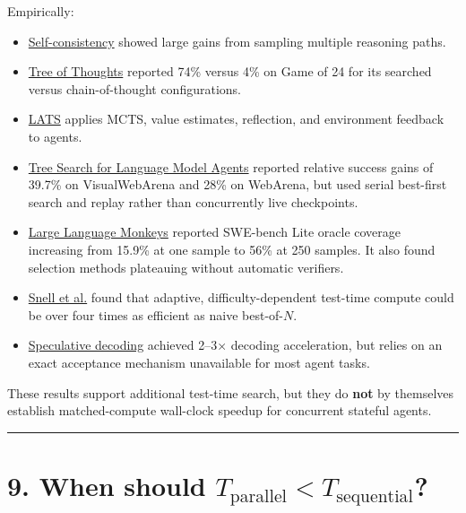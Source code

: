 \documentclass[
  letterpaper,
]{article}
\providecommand{\tightlist}{%
  \setlength{\itemsep}{0pt}\setlength{\parskip}{0pt}}
\begin{document}
Empirically:

\begin{itemize}
\tightlist
\item
  \href{https://arxiv.org/abs/2203.11171}{Self-consistency} showed large gains from sampling multiple reasoning paths.
\item
  \href{https://arxiv.org/abs/2305.10601}{Tree of Thoughts} reported 74\% versus 4\% on Game of 24 for its searched versus chain-of-thought configurations.
\item
  \href{https://arxiv.org/abs/2310.04406}{LATS} applies MCTS, value estimates, reflection, and environment feedback to agents.
\item
  \href{https://arxiv.org/abs/2407.01476}{Tree Search for Language Model Agents} reported relative success gains of 39.7\% on VisualWebArena and 28\% on WebArena, but used serial best-first search and replay rather than concurrently live checkpoints.
\item
  \href{https://arxiv.org/abs/2407.21787}{Large Language Monkeys} reported SWE-bench Lite oracle coverage increasing from 15.9\% at one sample to 56\% at 250 samples. It also found selection methods plateauing without automatic verifiers.
\item
  \href{https://arxiv.org/abs/2408.03314}{Snell et al.} found that adaptive, difficulty-dependent test-time compute could be over four times as efficient as naive best-of-\(N\).
\item
  \href{https://arxiv.org/abs/2211.17192}{Speculative decoding} achieved 2--3× decoding acceleration, but relies on an exact acceptance mechanism unavailable for most agent tasks.
\end{itemize}

These results support additional test-time search, but they do \textbf{not} by themselves establish matched-compute wall-clock speedup for concurrent stateful agents.

\begin{center}\rule{0.5\linewidth}{0.5pt}\end{center}

\section{\texorpdfstring{9. When should \(T_{\text{parallel}}<T_{\text{sequential}}\)?}{9. When should T\_\{\textbackslash text\{parallel\}\}\textless T\_\{\textbackslash text\{sequential\}\}?}}\label{when-should-t_textparallelt_textsequential}
\end{document}
